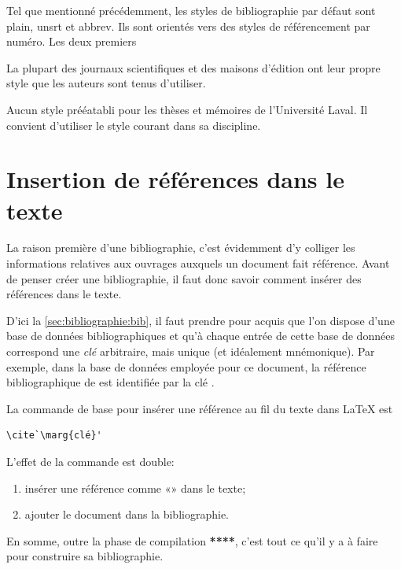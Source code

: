 Tel que mentionné précédemment, les styles de bibliographie par défaut
sont plain, unsrt et abbrev. Ils sont orientés vers des styles de
référencement par numéro. Les deux premiers


La plupart des journaux scientifiques et des maisons d'édition ont
leur propre style que les auteurs sont tenus d'utiliser.

Aucun style prééatabli pour les thèses et mémoires de l'Université
Laval. Il convient d'utiliser le style courant dans sa discipline.

\section{Insertion de références dans le texte}
\label{sec:bibliographie:cite}

La raison première d'une bibliographie, c'est évidemment d'y colliger
les informations relatives aux ouvrages auxquels un document fait
référence. Avant de penser créer une bibliographie, il faut donc
savoir comment insérer des références dans le texte.

D'ici la \autoref{sec:bibliographie:bib}, il faut prendre pour acquis
que l'on dispose d'une base de données bibliographiques et qu'à chaque
entrée de cette base de données correspond une \emph{clé} arbitraire,
mais unique (et idéalement mnémonique). Par exemple, dans la base de
données employée pour ce document, la référence bibliographique de
\citet{Mori:bibliographies:2009} est identifiée par la clé
.

La commande de base pour insérer une référence au fil du texte dans
{\LaTeX} est
\begin{lstlisting}
\cite`\marg{clé}'
\end{lstlisting}
L'effet de la commande est double:
\begin{enumerate}
\item insérer une référence comme «»
  dans le texte;
\item ajouter le document dans la bibliographie.
\end{enumerate}
En somme, outre la phase de compilation \textbf{****}, c'est tout ce
qu'il y a à faire pour construire sa bibliographie.

